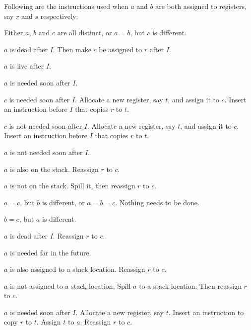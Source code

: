 Following are the instructions used when $a$ and $b$ are both assigned
to registers, say $r$ and $s$ respectively:

\begin{legal}
\item Either $a$, $b$ and $c$ are all distinct, or $a = b$, but $c$ is
  different.
  \begin{legal}
  \item $a$ is dead after $I$.  Then make $c$ be assigned to $r$
    after $I$.
  \item $a$ is live after $I$.
    \begin{legal}
    \item $a$ is needed soon after $I$.
      \begin{legal}
      \item $c$ is needed soon after $I$. Allocate a new register, say
        $t$, and assign it to $c$.  Insert an instruction before $I$
        that copies $r$ to $t$.
      \item $c$ is not needed soon after $I$.  Allocate a new
        register, say $t$, and assign it to $c$.  Insert an
        instruction before $I$ that copies $r$ to $t$.
      \end{legal}
    \item $a$ is not needed soon after $I$.
      \begin{legal}
      \item $a$ is also on the stack.  Reassign $r$ to $c$.
      \item $a$ is not on the stack.  Spill it, then reassign $r$ to
        $c$.
      \end{legal}
    \end{legal}
  \end{legal}
\item $a = c$, but $b$ is different, or $a = b = c$. Nothing needs to
  be done.
\item $b = c$, but $a$ is different.
  \begin{legal}
  \item $a$ is dead after $I$.  Reassign $r$ to $c$.
  \item $a$ is needed far in the future.
    \begin{legal}
    \item $a$ is also assigned to a stack location.  Reassign $r$ to $c$.
    \item $a$ is not assigned to a stack location.  Spill $a$ to a
      stack location.  Then reassign $r$ to $c$.
    \end{legal}
  \item $a$ is needed soon after $I$.  Allocate a new register, say
    $t$.  Insert an instruction to copy $r$ to $t$.  Assign $t$ to
    $a$.  Reassign $r$ to $c$.
  \end{legal}
\end{legal}


